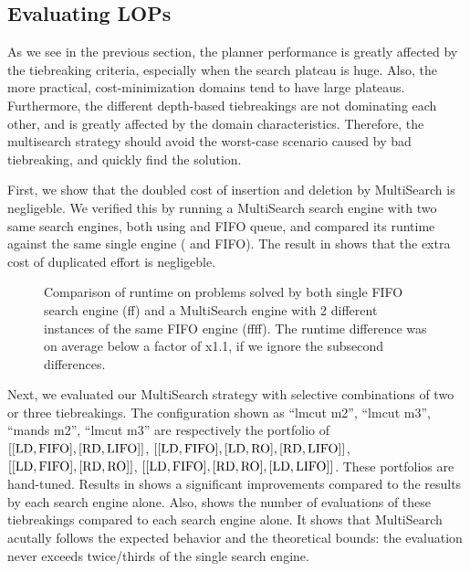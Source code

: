 \subsection{Evaluating LOPs}

As we see in the previous section, the planner performance is greatly
affected by the tiebreaking criteria, especially when the search plateau
is huge.
% 
Also, the more practical, cost-minimization domains tend to have large plateaus.
% 
Furthermore, the different depth-based tiebreakings are not dominating
each other, and is greatly affected by the domain characteristics.
% 
Therefore, the multisearch strategy should avoid the
worst-case scenario caused by bad tiebreaking, and quickly find the solution.

First, we show that the doubled cost of insertion and deletion by
MultiSearch is negligeble.  We verified this by running a MultiSearch
search engine with two same search engines, both using \lmcut and FIFO
queue, and compared its runtime against the same single engine (\lmcut
and FIFO). The result in  shows that the extra cost of
duplicated effort is negligeble.

\begin{figure}[htb]
 \centering
 \caption{Comparison of runtime on problems solved by both single FIFO search engine (ff) and a MultiSearch engine with 2 different instances of the same FIFO engine (ffff). The runtime difference was on average below a factor of x1.1, if we ignore the subsecond differences.}
 \label{ffff}
\end{figure}

Next, we evaluated our MultiSearch
strategy with selective combinations of two or three tiebreakings.
The configuration shown as ``lmcut m2'', ``lmcut m3'', ``mands m2'',
``lmcut m3'' are respectively the portfolio of
$[[\mbox{LD},\mbox{FIFO}], [\mbox{RD},\mbox{LIFO}]]$, $[[\mbox{LD},\mbox{FIFO}], [\mbox{LD},\mbox{RO}], [\mbox{RD},\mbox{LIFO}]]$,
$[[\mbox{LD},\mbox{FIFO}],[\mbox{RD},\mbox{RO}]]$, $[[\mbox{LD},\mbox{FIFO}],[\mbox{RD},\mbox{RO}],[\mbox{LD},\mbox{LIFO}]]$. These
portfolios are hand-tuned.
Results in 
shows a significant improvements compared to the results by each search
engine alone.
% 
Also,  shows the number of evaluations of these
tiebreakings compared to each search engine alone.  It shows that
MultiSearch acutally follows the expected behavior and the theoretical
bounds: the evaluation never exceeds twice/thirds of the single
search engine.

